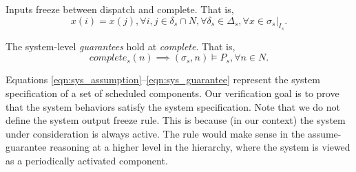 Inputs freeze between dispatch and complete. That is,
\begin{equation} 
\label{eqn:sys_inputfreeze}
	x(i) = x(j), \forall i,j\in \delta_s \cap N, \forall \delta_s \in \Delta_s, \forall x \in \sigma_s|_{I_s}.
\end{equation}

The system-level \emph{guarantees} hold at \emph{complete}. That is,
\begin{equation} 
\label{eqn:sys_guarantee}
	complete_s(n) \implies (\sigma_s, n) \models P_s, \forall n\in N.
\end{equation}

Equations \ref{eqn:sys_assumption}--\ref{eqn:sys_guarantee} represent the system specification of a set of scheduled components. 
Our verification goal is to prove that the system behaviors satisfy the system specification. 
Note that we do not define the system output freeze rule.
This is because (in our context) the system under consideration is always active. The rule would make sense in the assume-guarantee reasoning at a higher level in the hierarchy, where the system is viewed as a periodically activated component.%
